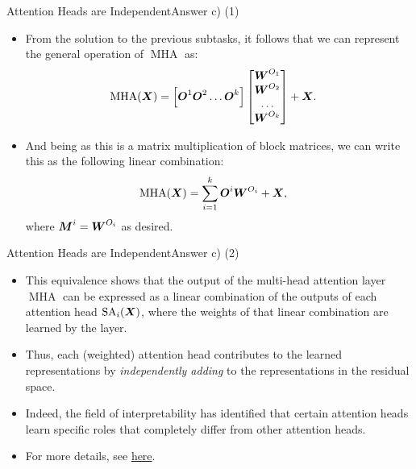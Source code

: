 \documentclass[t]{beamer}
\newcommand\op[1]{\operatorname{#1}}
\begin{document}
\begin{frame}{Attention Heads are Independent}{Answer c) (1)}
    \begin{itemize}
        \item From the solution to the previous subtasks, it follows that we can
              represent the general operation of $\op{MHA}$ as:
              \begin{align}
                  \op{MHA}(\mX) & = \left[\mO^1\mO^2\ldots\mO^k\right] \begin{bmatrix}
                                                                           \mW^{O_1} \\
                                                                           \mW^{O_2} \\
                                                                           \ldots    \\
                                                                           \mW^{O_k}
                                                                       \end{bmatrix}
                  + \mX.
              \end{align}
        \item And being as this is a matrix multiplication of block matrices, we
              can write this as the following linear combination:
              \begin{align}
                  \op{MHA}(\mX) & = \sum_{i=1}^{k} \mO^i\mW^{O_i} + \mX,
              \end{align}
              where ${\boldsymbol{M}}^i = {\boldsymbol{W}}^{O_i}$ as desired.
    \end{itemize}
\end{frame}

\begin{frame}{Attention Heads are Independent}{Answer c) (2)}
    \begin{itemize}
        \item This equivalence shows that the output of the multi-head attention
              layer $\op{MHA}$ can be expressed as a linear combination of the
              outputs of each attention head $\op{SA}_i(\mX)$, where the weights
              of that linear combination are learned by the layer.
        \item Thus, each (weighted) attention head contributes to the
              learned representations by \emph{independently adding} to the 
              representations in the residual space.
        \item Indeed, the field of interpretability has identified that certain
              attention heads learn specific roles that completely differ from 
              other attention heads.
        \item For more details, see 
        \href{https://transformer-circuits.pub/2021/framework/index.html}{here}.
    \end{itemize}
\end{frame}
\end{document}
